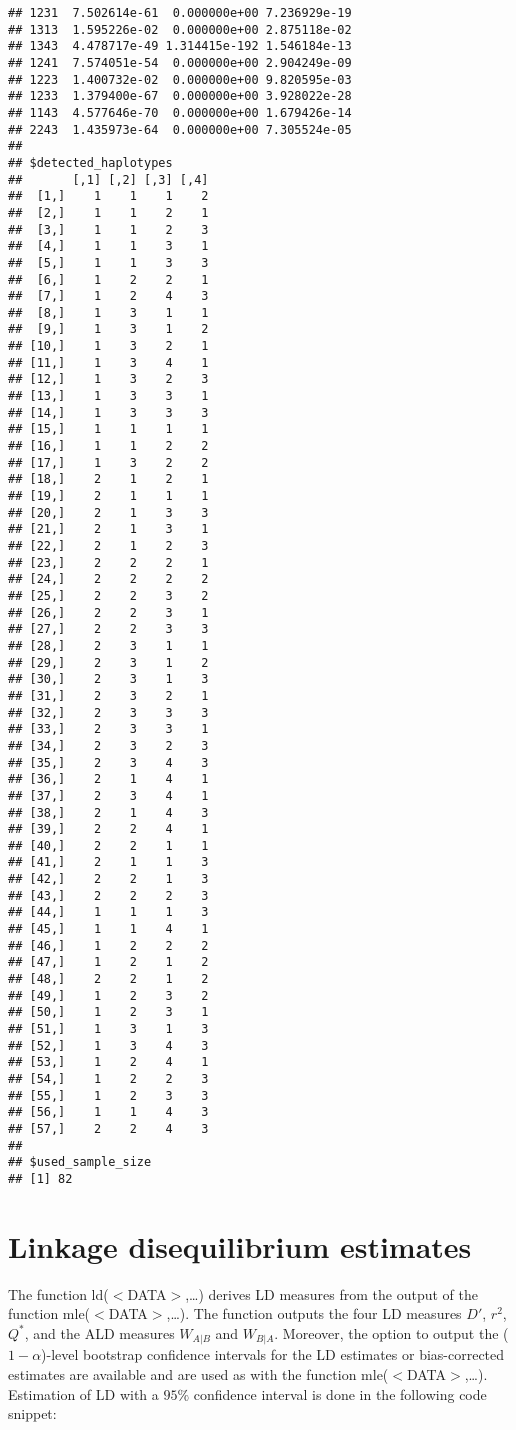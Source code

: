 \documentclass[
]{article}
\begin{document}
\begin{verbatim}
## 1231  7.502614e-61  0.000000e+00 7.236929e-19
## 1313  1.595226e-02  0.000000e+00 2.875118e-02
## 1343  4.478717e-49 1.314415e-192 1.546184e-13
## 1241  7.574051e-54  0.000000e+00 2.904249e-09
## 1223  1.400732e-02  0.000000e+00 9.820595e-03
## 1233  1.379400e-67  0.000000e+00 3.928022e-28
## 1143  4.577646e-70  0.000000e+00 1.679426e-14
## 2243  1.435973e-64  0.000000e+00 7.305524e-05
## 
## $detected_haplotypes
##       [,1] [,2] [,3] [,4]
##  [1,]    1    1    1    2
##  [2,]    1    1    2    1
##  [3,]    1    1    2    3
##  [4,]    1    1    3    1
##  [5,]    1    1    3    3
##  [6,]    1    2    2    1
##  [7,]    1    2    4    3
##  [8,]    1    3    1    1
##  [9,]    1    3    1    2
## [10,]    1    3    2    1
## [11,]    1    3    4    1
## [12,]    1    3    2    3
## [13,]    1    3    3    1
## [14,]    1    3    3    3
## [15,]    1    1    1    1
## [16,]    1    1    2    2
## [17,]    1    3    2    2
## [18,]    2    1    2    1
## [19,]    2    1    1    1
## [20,]    2    1    3    3
## [21,]    2    1    3    1
## [22,]    2    1    2    3
## [23,]    2    2    2    1
## [24,]    2    2    2    2
## [25,]    2    2    3    2
## [26,]    2    2    3    1
## [27,]    2    2    3    3
## [28,]    2    3    1    1
## [29,]    2    3    1    2
## [30,]    2    3    1    3
## [31,]    2    3    2    1
## [32,]    2    3    3    3
## [33,]    2    3    3    1
## [34,]    2    3    2    3
## [35,]    2    3    4    3
## [36,]    2    1    4    1
## [37,]    2    3    4    1
## [38,]    2    1    4    3
## [39,]    2    2    4    1
## [40,]    2    2    1    1
## [41,]    2    1    1    3
## [42,]    2    2    1    3
## [43,]    2    2    2    3
## [44,]    1    1    1    3
## [45,]    1    1    4    1
## [46,]    1    2    2    2
## [47,]    1    2    1    2
## [48,]    2    2    1    2
## [49,]    1    2    3    2
## [50,]    1    2    3    1
## [51,]    1    3    1    3
## [52,]    1    3    4    3
## [53,]    1    2    4    1
## [54,]    1    2    2    3
## [55,]    1    2    3    3
## [56,]    1    1    4    3
## [57,]    2    2    4    3
## 
## $used_sample_size
## [1] 82
\end{verbatim}

\section*{Linkage disequilibrium estimates}

The function ld(\(<\)DATA\(>\),\ldots) derives LD measures from the
output of the function mle(\(<\)DATA\(>\),\ldots). The function outputs
the four LD measures \(D'\), \(r^2\), \(Q^\ast\), and the ALD measures
\(W_{A|B}\) and \(W_{B|A}\). Moreover, the option to output the
(\(1-\alpha\))-level bootstrap confidence intervals for the LD estimates
or bias-corrected estimates are available and are used as with the
function mle(\(<\)DATA\(>\),\ldots). Estimation of LD with a \(95\%\)
confidence interval is done in the following code snippet:
\end{document}
